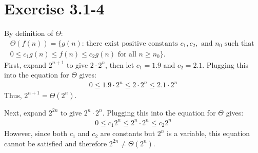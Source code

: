 \documentclass{article}
\begin{document}
\section*{Exercise 3.1-4}

By definition of $\Theta$:
\begin{eqnarray*}
	\Theta(f(n)) = \{g(n) \text{: there exist positive constants } c_1, c_2, \text{ and } n_0 \text{ such that } \\
	0 \leq c_1 g(n) \leq f(n) \leq c_2 g(n) \text{ for all } n \geq n_0\}.
\end{eqnarray*}
First, expand $2^{n+1}$ to give $2 \cdot 2^n$, then let $c_1 = 1.9$ and $c_2 = 2.1$. Plugging this into the equation for $\Theta$ gives:
\begin{eqnarray*}
	0 \leq 1.9 \cdot 2^n \leq 2 \cdot 2^n \leq 2.1 \cdot 2^n
\end{eqnarray*}
Thus, $2^{n+1} = \Theta(2^n)$.

Next, expand $2^{2n}$ to give $2^n \cdot 2^n$. Plugging this into the equation for $\Theta$ gives:
\begin{eqnarray*}
	0 \leq c_1 2^n \leq 2^n \cdot 2^n \leq c_2 2^n
\end{eqnarray*}
However, since both $c_1$ and $c_2$ are constants but $2^n$ is a variable, this equation cannot be satisfied and therefore $2^{2n} \neq \Theta(2^n)$.
\end{document}
